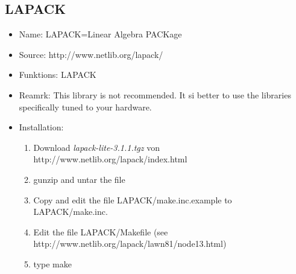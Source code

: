 \documentclass[a4paper,10pt]{report}
\begin{document}
\subsection{LAPACK}
\begin{itemize}
\item Name: LAPACK=Linear Algebra PACKage
\item Source: http://www.netlib.org/lapack/
\item Funktions: LAPACK
\item Reamrk: This library is not recommended. It si better to use the libraries specifically tuned to your hardware.
\item Installation:
\begin{enumerate}
\item Download \textit{lapack-lite-3.1.1.tgz} von
http://www.netlib.org/lapack/index.html
\item gunzip and untar the file
\item Copy and edit the file LAPACK/make.inc.example to LAPACK/make.inc.
\item Edit the file LAPACK/Makefile (see
http://www.netlib.org/lapack/lawn81/node13.html)
\item type make
\end{enumerate}
\end{itemize}

\end{document}
